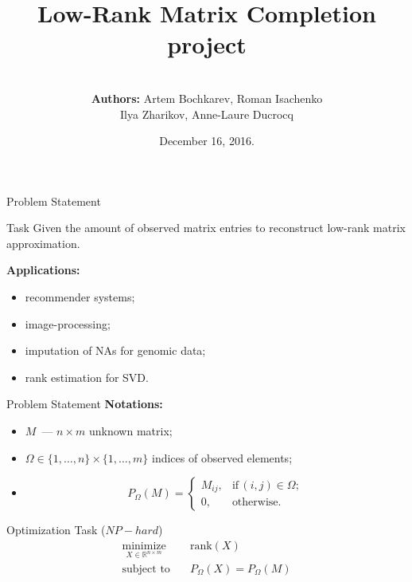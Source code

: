 \documentclass{beamer}
\title[\hbox to 56mm{Matrix Completion  \hfill\insertframenumber\,/\,\inserttotalframenumber}]
{Low-Rank Matrix Completion project}
\author[ROY team]{\\
				{\small \textbf{Authors:} Artem Bochkarev, Roman Isachenko \\
					 Ilya Zharikov, Anne-Laure Ducrocq}}
\institute[SkolTech]{Skolkovo Institute of Science and Technology \\
	Methods of Optimization course 
    \vspace{0.3cm}
}
\date{December 16, 2016.}
\begin{document}
\begin{frame}
\titlepage
\end{frame}
\begin{frame}{Problem Statement}
\begin{block}{Task}	
	Given the amount of observed matrix entries to reconstruct low-rank matrix approximation.
\end{block}
\vspace{0.3cm}
\textbf{Applications:}
\begin{itemize}
	\item  recommender systems;
	\item image-processing;
	\item imputation of NAs for genomic data;
	\item rank estimation for SVD.
\end{itemize}
\end{frame}
\begin{frame}{Problem Statement}
\textbf{Notations:}
\begin{itemize}
	\item $M$~--- $n \times m$ unknown matrix;
	\item $\Omega \in \{1, \dots, n\} \times \{1, \dots, m\}$ indices of observed elements;
	\item 
	$$
	P_{\Omega} (M) = 
	\begin{cases}
	M_{ij}, &\text{if} \, (i, j) \in \Omega;\\
	0, &\text{otherwise}.
	\end{cases}
	$$
\end{itemize}
\begin{block}{Optimization Task ($NP-hard$)}
	\vspace{-0.5cm}
	\begin{align*}
		\mathop{\text{minimize}}\limits_{X \in \mathbb{R}^{n \times m}} \quad & 
		\text{rank} (X) \\
		\text{subject to} \quad & P_{\Omega} (X) = P_{\Omega} (M)
	\end{align*}
\end{block}
\end{frame}
\end{document}
